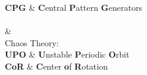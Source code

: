 \documentclass[11pt, a4paper, oneside]{Thesis} %
\begin{document}
{
\textbf{CPG} & \textbf{C}entral \textbf{P}attern \textbf{G}enerators \\ \\

& \\

Chaos Theory: \\

\textbf{UPO} & \textbf{U}nstable \textbf{P}eriodic \textbf{O}rbit\\

\textbf{CoR} & \textbf{C}enter \textbf{o}f \textbf{R}otation

}
\end{document}
